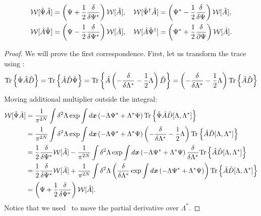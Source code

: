 \begin{theorem}
\label{thm:formalism:func-wigner:correspondences}
\begin{equation*}
\begin{split}
	\mathcal{W} [ \hat{\Psi} \hat{A} ]
		& = \left( \Psi + \frac{1}{2} \frac{\delta}{\delta \Psi^*} \right) \mathcal{W}[\hat{A}],
	\quad
	\mathcal{W} [ \hat{\Psi}^\dagger \hat{A} ]
		= \left( \Psi^* - \frac{1}{2} \frac{\delta}{\delta \Psi} \right) \mathcal{W}[\hat{A}], \\
	\mathcal{W} [ \hat{A} \hat{\Psi} ]
		& = \left( \Psi - \frac{1}{2} \frac{\delta}{\delta \Psi^*} \right) \mathcal{W}[\hat{A}],
	\quad
	\mathcal{W} [ \hat{A} \hat{\Psi}^\dagger ]
		= \left( \Psi^* + \frac{1}{2} \frac{\delta}{\partial \Psi} \right) \mathcal{W}[\hat{A}].
\end{split}
\end{equation*}
\end{theorem}
\begin{proof}
We will prove the first correspondence.
First, let us transform the trace using :
\begin{equation*}
\begin{split}
	\mathrm{Tr} \left\{  \hat{\Psi} \hat{A} \hat{D}  \right\}
	= \mathrm{Tr} \left\{  \hat{A} \hat{D} \hat{\Psi} \right\}
	= \mathrm{Tr} \left\{  \hat{A} \left(
		-\frac{\delta}{\delta \Lambda^*}
		-\frac{1}{2} \Lambda
	\right) \hat{D} \right\}
	= \left(
		-\frac{\delta}{\delta \Lambda^*}
		-\frac{1}{2} \Lambda
	\right) \mathrm{Tr} \left\{  \hat{A} \hat{D} \right\}
\end{split}
\end{equation*}
Moving additional multiplier outside the integral:
\begin{equation*}
\begin{split}
	\mathcal{W} [ \hat{\Psi} \hat{A} ]
	& = \frac{1}{\pi^{2N}} \int \delta^2 \Lambda
		\exp \int d\boldsymbol{x} \left( -\Lambda \Psi^* + \Lambda^* \Psi \right)
		\mathrm{Tr} \left\{  \hat{\Psi} \hat{A} \hat{D}[\Lambda, \Lambda^*]  \right\} \\
	& = \frac{1}{\pi^{2N}} \int \delta^2 \Lambda
		\exp \int d\boldsymbol{x} \left( -\Lambda \Psi^* + \Lambda^* \Psi \right)
		\left(
			-\frac{\delta}{\delta \Lambda^*}
			-\frac{1}{2} \Lambda
		\right)
		\mathrm{Tr} \left\{  \hat{A} \hat{D}[\Lambda, \Lambda^*]  \right\} \\
	& = \frac{1}{2} \frac{\delta}{\delta \Psi^*} \mathcal{W} [\hat{A}]
	- \frac{1}{\pi^{2N}} \int \delta^2 \Lambda
		\exp \int d\boldsymbol{x} \left( -\Lambda \Psi^* + \Lambda^* \Psi \right)
		\frac{\delta}{\delta \Lambda^*}
		\mathrm{Tr} \left\{  \hat{A} \hat{D}[\Lambda, \Lambda^*]  \right\} \\
	& = \frac{1}{2} \frac{\delta}{\delta \Psi^*} \mathcal{W} [\hat{A}]
	+ \frac{1}{\pi^{2N}} \int \delta^2 \Lambda \left(
		\frac{\delta}{\delta \Lambda^*}
		\exp \int d\boldsymbol{x} \left( -\Lambda \Psi^* + \Lambda^* \Psi \right)
	\right)
	\mathrm{Tr} \left\{  \hat{A} \hat{D}[\Lambda, \Lambda^*]  \right\} \\
	& = \left( \Psi + \frac{1}{2} \frac{\delta}{\delta \Psi^*} \right) \mathcal{W} [\hat{A}].
\end{split}
\end{equation*}
Notice that we used~ to move the partial derivative over $\Lambda^*$.
\end{proof}
